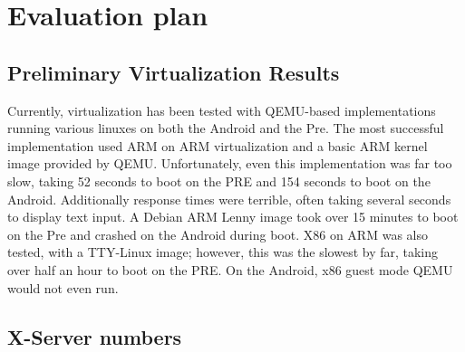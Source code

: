 \section{Evaluation plan}
\subsection{Preliminary Virtualization Results}
Currently, virtualization has been tested with QEMU-based implementations running various linuxes on both the Android and the Pre.  The most successful implementation used ARM on ARM virtualization and a basic ARM kernel image provided by QEMU.  Unfortunately, even this implementation was far too slow, taking 52 seconds to boot on the PRE and 154 seconds to boot on the Android.  Additionally response times were terrible, often taking several seconds to display text input.  A Debian ARM Lenny image took over 15 minutes to boot on the Pre and crashed on the Android during boot.  X86 on ARM was also tested, with a TTY-Linux image; however, this was the slowest by far, taking over half an hour to boot on the PRE.  On the Android, x86 guest mode QEMU would not even run.
\subsection{X-Server numbers}
